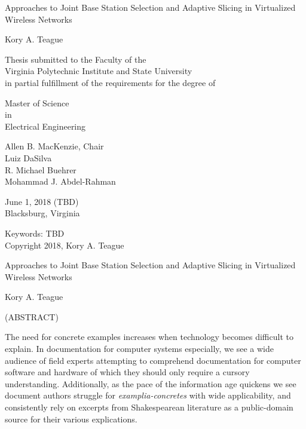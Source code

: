 \documentclass[12pt,dvips]{report}
\begin{document}
\thispagestyle{empty}
\begin{center}

{\Large 
Approaches to Joint Base Station Selection and Adaptive Slicing in Virtualized Wireless Networks
}

\vfill

Kory A. Teague

\vfill

Thesis submitted to the Faculty of the \\
Virginia Polytechnic Institute and State University \\
in partial fulfillment of the requirements for the degree of

\vfill

Master of Science \\
in \\
Electrical Engineering

\vfill

Allen B. MacKenzie, Chair \\
Luiz DaSilva \\
R. Michael Buehrer \\
Mohammad J. Abdel-Rahman

\vfill

June 1, 2018 (TBD)\\
Blacksburg, Virginia

\vfill

Keywords: TBD
\\
Copyright 2018, Kory A. Teague

\end{center}

\pagebreak

\thispagestyle{empty}
\begin{center}

{\large Approaches to Joint Base Station Selection and Adaptive Slicing in Virtualized Wireless Networks}

\vfill

Kory A. Teague

\vfill

(ABSTRACT)

\vfill

\end{center}

\iffalse
The need for concrete examples increases when technology becomes
difficult to explain.  In documentation for computer systems
especially, we see a wide audience of field experts attempting to
comprehend documentation for computer software and hardware of which
they should only require a cursory understanding.  Additionally, as
the pace of the information age quickens we see document authors
struggle for \textit{examplia-concretes} with wide applicability, and
consistently rely on excerpts from Shakespearean literature as a
public-domain source for their various explications.
\end{document}
